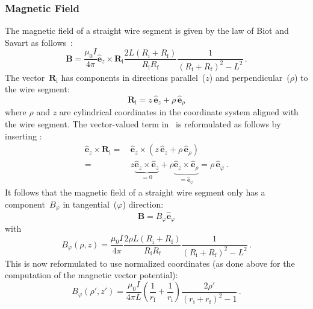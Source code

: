 \subsubsection{Magnetic Field}
The magnetic field of a straight wire segment
is given by the law of Biot and Savart as follows~\cite{hanson_hirshman_2002}:
\begin{equation}
 \mathbf{B}
 = \frac{\mu_0 I}{4 \pi}
   \hat{\mathbf{e}}_z \times \mathbf{R}_\mathrm{i}
   \frac{2 L (R_\mathrm{i} + R_\mathrm{f})}{R_\mathrm{i} R_\mathrm{f}} \frac{1}{\left(R_\mathrm{i} + R_\mathrm{f}\right)^2 - L^2} \, . \label{eqn:sws_B_phi}
\end{equation}
The vector~$\mathbf{R}_\mathrm{i}$ has components in directions parallel~($z$) and perpendicular~($\rho$) to the wire segment:
\begin{equation}
 \mathbf{R}_\mathrm{i}
 = z \,\hat{\mathbf{e}}_z + \rho \,\hat{\mathbf{e}}_\rho \label{eqn:R_i_vec}
\end{equation}
where $\rho$ and $z$ are cylindrical coordinates in the coordinate system aligned with the wire segment.
The vector-valued term in~ is reformulated as follows by inserting :
\begin{align}
 \hat{\mathbf{e}}_z \times \mathbf{R}_\mathrm{i}
 =&\, \hat{\mathbf{e}}_z \times \left( z \,\hat{\mathbf{e}}_z + \rho \,\hat{\mathbf{e}}_\rho \right) \nonumber \\
 =&\,      z \underbrace{\hat{\mathbf{e}}_z \times \hat{\mathbf{e}}_z}_{=0}
      + \rho \underbrace{\hat{\mathbf{e}}_z \times \hat{\mathbf{e}}_\rho}_{=\hat{\mathbf{e}}_\varphi}
 = \rho \,\hat{\mathbf{e}}_\varphi \, .
\end{align}
It follows that the magnetic field of a straight wire segment only has a component~$B_\varphi$ in tangential~($\varphi$) direction:
\begin{equation}
 \mathbf{B} = B_\varphi \hat{\mathbf{e}}_\varphi
\end{equation}
with
\begin{equation}
 B_\varphi (\rho, z)
 = \frac{\mu_0 I}{4 \pi}
   \frac{2 \rho L (R_\mathrm{i} + R_\mathrm{f})}{R_\mathrm{i} R_\mathrm{f}}
   \frac{1}{\left(R_\mathrm{i} + R_\mathrm{f}\right)^2 - L^2} \, .
\end{equation}
This is now reformulated to use normalized coordinates
(as done above for the computation of the magnetic vector potential):
\begin{equation}
 B_\varphi(\rho', z')
 = \frac{\mu_0 I}{4 \pi L}
   \left(\frac{1}{r_\mathrm{f}} + \frac{1}{r_\mathrm{i}} \right)
   \frac{2 \rho'}{\left( r_\mathrm{i} + r_\mathrm{f} \right)^2 - 1} \, .
\end{equation}
